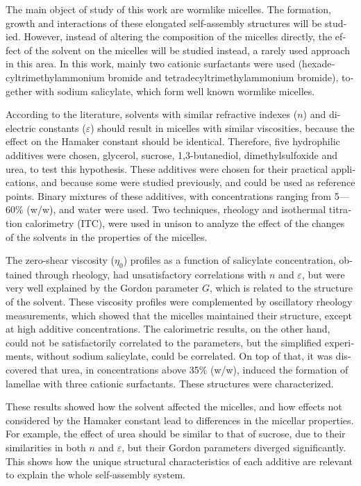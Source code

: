 \documentclass[
	12pt,				%
	openright,			%
	twoside,			%
	a4paper,			%
	english,			%
	brazil%
	]{abntex2}
\begin{document}
\begin{resumo}[Abstract]
 \begin{english}
 	The main object of study of this work are wormlike micelles. The formation, growth and interactions of these elongated self-assembly structures will be studied. However, instead of altering the composition of the micelles directly, the effect of the solvent on the micelles will be studied instead, a rarely used approach in this area. In this work, mainly two cationic surfactants were used (hexadecyltrimethylammonium bromide and tetradecyltrimethylammonium bromide), together with sodium salicylate, which form well known wormlike micelles.
 	
 	According to the literature, solvents with similar refractive indexes (\(n\)) and dielectric constants (\(\varepsilon\)) should result in micelles with similar viscosities, because the effect on the Hamaker constant should be identical. Therefore, five hydrophilic additives were chosen, glycerol, sucrose, 1,3-butanediol, dimethylsulfoxide and urea, to test this hypothesis. These additives were chosen for their practical applications, and because some were studied previously, and could be used as reference points. Binary mixtures of these additives, with concentrations ranging from 5---60\% (w/w), and water were used. Two techniques, rheology and isothermal titration calorimetry (ITC), were used in unison to analyze the effect of the changes of the solvents in the properties of the micelles.
 	
 	The zero-shear viscosity (\(\eta_0\)) profiles as a function of salicylate concentration, obtained through rheology, had unsatisfactory correlations with \(n\) and \(\varepsilon\), but were very well explained by the Gordon parameter \(G\), which is related to the structure of the solvent. These viscosity profiles were complemented by oscillatory rheology measurements, which showed that the micelles maintained their structure, except at high additive concentrations. The calorimetric results, on the other hand, could not be satisfactorily correlated to the parameters, but the simplified experiments, without sodium salicylate, could be correlated. On top of that, it was discovered that urea, in concentrations above 35\% (w/w), induced the formation of lamellae with three cationic surfactants. These structures were characterized.
 	
 	These results showed how the solvent affected the micelles, and how effects not considered by the Hamaker constant lead to differences in the micellar properties. For example, the effect of urea should be similar to that of sucrose, due to their similarities in both \(n\) and \(\varepsilon\), but their Gordon parameters diverged significantly. This shows how the unique structural characteristics of each additive are relevant to explain the whole self-assembly system.
 	

\end{english}
\end{resumo}
\end{document}
